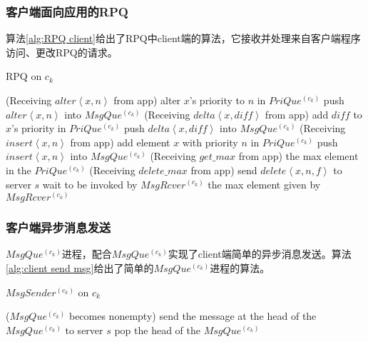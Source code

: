 		\subsubsection{客户端面向应用的RPQ}
			\par 算法\ref{alg:RPQ client}给出了RPQ中client端的算法，它接收并处理来自客户端程序访问、更改RPQ的请求。
			\begin{algorithm}
				\caption{RPQ on $c_k$}
				\label{alg:RPQ client}
				\Begin(Receiving $alter\left\langle x,n\right\rangle $ from app)
				{
					alter $x$'s priority to $n$ in $PriQue^{(c_{k})}$\;
					push $alter\left\langle x,n\right\rangle $ into $MsgQue^{(c_{k})}$\;
				}
				\Begin(Receiving $delta\left\langle x,diff\right\rangle $ from app)
				{
					add $diff$ to $x$'s priority in $PriQue^{(c_{k})}$\; 
					push $delta \left\langle x,diff\right\rangle $ into $MsgQue^{(c_{k})}$\;
				}
				\Begin(Receiving $insert\left\langle x,n\right\rangle $ from app)
				{
					add element $x$ with priority $n$ in $PriQue^{(c_{k})}$\;
					push $insert\left\langle x,n\right\rangle $ into $MsgQue^{(c_{k})}$\;
				}
				\Begin(Receiving $get\_max$ from app)
				{
					\Return the max element in the $PriQue^{(c_{k})}$\;
				}
				\Begin(Receiving $delete\_max$ from app)
				{
					send $delete\left\langle x,n,f\right\rangle $ to server $s$\;
					wait to be invoked by $MsgRcver^{(c_{k})}$\;
					\Return the max element given by $MsgRcver^{(c_{k})}$\;
				}
			\end{algorithm}
		\subsubsection{客户端异步消息发送}
			\par $MsgQue^{(c_{k})}$进程，配合$MsgQue^{(c_{k})}$实现了client端简单的异步消息发送。算法\ref{alg:client send msg}给出了简单的$MsgQue^{(c_{k})}$进程的算法。
			\begin{algorithm}
				\caption{$MsgSender^{(c_{k})}$ on $c_k$}
				\label{alg:client send msg}
				\Begin($MsgQue^{(c_{k})}$ becomes nonempty)
				{
					\While{$MsgQue^{(c_{k})}$ is not empty}
					{
						send the message at the head of the $MsgQue^{(c_{k})}$ to server $s$\;
						pop the head of the $MsgQue^{(c_{k})}$\;
					}
				}
			\end{algorithm}
